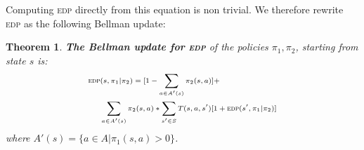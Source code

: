 \documentclass[letterpaper]{article}
\newtheorem{theorem}{Theorem}
\begin{document}
\noindent Computing \textsc{edp} directly from this equation is non trivial. We therefore rewrite \textsc{edp} as the following Bellman update:
\begin{theorem}
\label{thm:bellman}
\textbf{The Bellman update for \textsc{edp}} of the policies $\pi_1, \pi_2$, starting from state $s$ is:
\begin{equation}
\scriptsize
\begin{split}
    \textsc{edp} & (s, \pi_1 |  \pi_2) = [1 - \sum\limits_{a\in A'(s)}\pi_2(s, a)] + \\ &
    \sum\limits_{a\in A'(s)}\pi_2(s,a) * \sum\limits_{s'\in S}T(s, a, s')[1 + \textsc{edp}(s', \pi_1 |  \pi_2)]
\end{split}
\normalsize
\label{eq:bellman}
\end{equation}
where $A'(s)=\{a\in A | \pi_1(s, a) > 0\}$.
\end{theorem}
\end{document}
